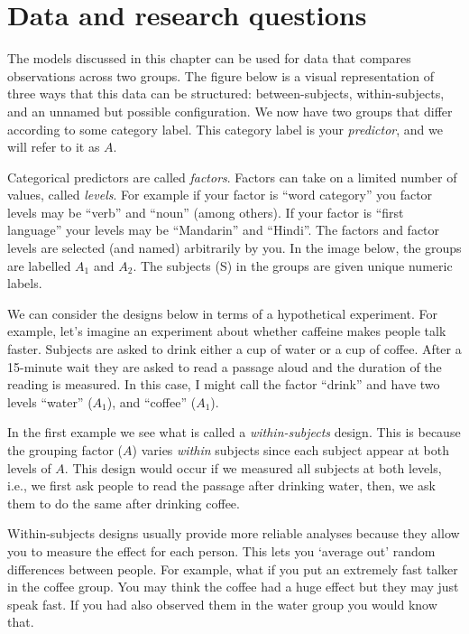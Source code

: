 \documentclass[
]{book}
\begin{document}
\hypertarget{data-and-research-questions-2}{%
\section{Data and research questions}\label{data-and-research-questions-2}}

The models discussed in this chapter can be used for data that compares observations across two groups. The figure below is a visual representation of three ways that this data can be structured: between-subjects, within-subjects, and an unnamed but possible configuration. We now have two groups that differ according to some category label. This category label is your \emph{predictor}, and we will refer to it as \(A\).

Categorical predictors are called \emph{factors}. Factors can take on a limited number of values, called \emph{levels}. For example if your factor is ``word category'' you factor levels may be ``verb'' and ``noun'' (among others). If your factor is ``first language'' your levels may be ``Mandarin'' and ``Hindi''. The factors and factor levels are selected (and named) arbitrarily by you. In the image below, the groups are labelled \(A_1\) and \(A_2\). The subjects (S) in the groups are given unique numeric labels.

We can consider the designs below in terms of a hypothetical experiment. For example, let's imagine an experiment about whether caffeine makes people talk faster. Subjects are asked to drink either a cup of water or a cup of coffee. After a 15-minute wait they are asked to read a passage aloud and the duration of the reading is measured. In this case, I might call the factor ``drink'' and have two levels ``water'' (\(A_1\)), and ``coffee'' (\(A_1\)).

In the first example we see what is called a \emph{within-subjects} design. This is because the grouping factor (\(A\)) varies \emph{within} subjects since each subject appear at both levels of \(A\). This design would occur if we measured all subjects at both levels, i.e., we first ask people to read the passage after drinking water, then, we ask them to do the same after drinking coffee.

Within-subjects designs usually provide more reliable analyses because they allow you to measure the effect for each person. This lets you `average out' random differences between people. For example, what if you put an extremely fast talker in the coffee group. You may think the coffee had a huge effect but they may just speak fast. If you had also observed them in the water group you would know that.
\end{document}
